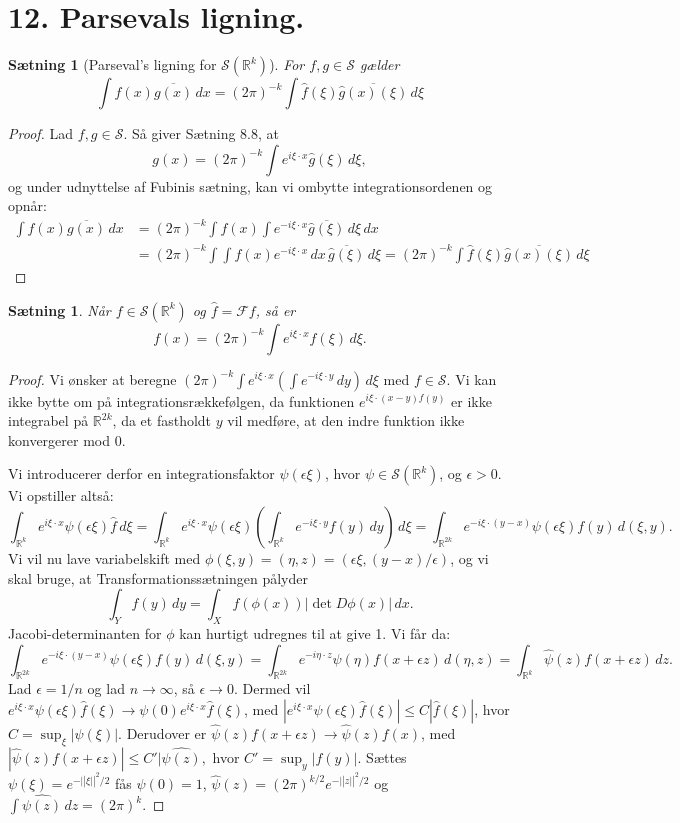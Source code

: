 \documentclass[12pt]{report}
\newtheorem{theorem}[lemma]{Sætning}
\theoremstyle{break}
\newtheorem*{proof}{Bevis}
\theoremstyle{break}
\newcommand{\RR}{\mathbb{R}}
\newcommand{\FS}{\mathcal{S}}
\newcommand{\FI}{\mathcal{F}}
\newcommand{\laengde}[1]{\lvert|#1\rvert|}
\begin{document}
\newpage
\section*{12. Parsevals ligning.}
\begin{theorem}[Parseval's ligning for $\FS(\RR^k)$]
For $f,g\in\FS$ gælder
\[\int f(x)\overline{g(x)}\,dx = (2\pi)^{-k}\int\hat{f}(\xi)\overline{\hat{g}(x)(\xi)}\,d\xi\]
\end{theorem}
\begin{proof}
Lad $f,g\in\FS$. Så giver Sætning 8.8, at
\[g(x)=(2\pi)^{-k}\int e^{i\xi\cdot x}\hat{g}(\xi)\,d\xi,\] og under udnyttelse af Fubinis sætning, kan vi ombytte integrationsordenen og opnår:
\begin{align*}
\int f(x)\overline{g(x)}\,dx & =(2\pi)^{-k}\int f(x)\int e^{-i\xi\cdot x}\overline{\hat{g}(\xi)}\,d\xi\,dx\\& = (2\pi)^{-k}\int\int f(x) e^{-i\xi\cdot x}\,dx\,\overline{\hat{g}(\xi)}\,d\xi = (2\pi)^{-k}\int\hat{f}(\xi)\overline{\hat{g}(x)(\xi)}\,d\xi
\end{align*}
\end{proof}
\begin{theorem}
Når $f\in\FS(\RR^k)$ og $\hat{f}=\FI f$, så er
\[f(x)=(2\pi)^{-k}\int e^{i\xi\cdot x}\hat{f}(\xi)\,d\xi.\]
\end{theorem}
\begin{proof}
Vi ønsker at beregne $(2\pi)^{-k}\int e^{i\xi\cdot x}(\int e^{-i\xi\cdot y}\,dy)\,d\xi$ med $f\in\FS$. Vi kan ikke bytte om på integrationsrækkefølgen, da funktionen $e^{i\xi\cdot(x-y)f(y)}$ er ikke integrabel på $\RR^{2k}$, da et fastholdt $y$ vil medføre, at den indre funktion ikke konvergerer mod $0$.

\bigskip

Vi introducerer derfor en integrationsfaktor $\psi(\epsilon\xi)$, hvor $\psi\in\FS(\RR^k)$, og $\epsilon>0$.
Vi opstiller altså:
\[\int_{\RR^k}e^{i\xi\cdot x}\psi(\epsilon\xi)\hat{f}\,d\xi = \int_{\RR^k}e^{i\xi\cdot x}\psi(\epsilon\xi)\left(\int_{\RR^k}e^{-i\xi\cdot y}f(y)\,dy\right)\,d\xi=\int_{\RR^{2k}}e^{-i\xi\cdot (y-x)}\psi(\epsilon\xi)f(y)\,d(\xi,y).\]
Vi vil nu lave variabelskift med $\phi(\xi,y)=(\eta,z)=(\epsilon\xi,(y-x)/\epsilon)$, og vi skal bruge, at Transformationssætningen pålyder
\[\int_Yf(y)\,dy =\int_X f(\phi(x))|\det D\phi(x)|\,dx.\]
Jacobi-determinanten for $\phi$ kan hurtigt udregnes til at give 1. Vi får da:
\[\int_{\RR^{2k}}e^{-i\xi\cdot (y-x)}\psi(\epsilon\xi)f(y)\,d(\xi,y) = \int_{\RR^{2k}}e^{-i\eta\cdot z}\psi(\eta)f(x+\epsilon z)\,d(\eta,z) = \int_{\RR^k}\hat{\psi}(z)f(x+\epsilon z)\,dz.\]
Lad $\epsilon=1/n$ og lad  $n\to\infty$, så $\epsilon\to 0$. Dermed vil $e^{i\xi\cdot x}\psi(\epsilon\xi)\hat{f}(\xi)\to\psi(0)e^{i\xi\cdot x}\hat{f}(\xi)$, med $|e^{i\xi\cdot x}\psi(\epsilon\xi)\hat{f}(\xi)|\leq C|\hat{f}(\xi)|$, hvor $C=\sup_\xi|\psi(\xi)|$. Derudover er $\hat{\psi}(z)f(x+\epsilon z)\to\hat{\psi}(z)f(x)$, med $|\hat{\psi}(z)f(x+\epsilon z)|\leq C'|\hat{\psi(z)},$ hvor $C'=\sup_y|f(y)|$. Sættes $\psi(\xi)=e^{-\laengde{\xi}^2/2}$ fås $\psi(0)=1$, $\hat{\psi}(z)=(2\pi)^{k/2}e^{-\laengde{z}^2/2}$ og $\int\hat{\psi(z)}\,dz=(2\pi)^k.$
\end{proof}
\end{document}
